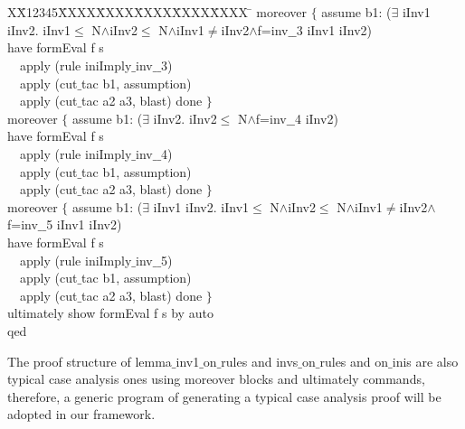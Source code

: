 \documentclass{llncs}
\newlength{\fminilength}
\newenvironment{fmini}[1][\linewidth]
  {\setlength{\fminilength}{#1\fboxsep-2\fboxrule}%
   \vspace{2ex}\noindent\begin{lrbox}{\fminibox}\begin{minipage}{\fminilength}%
   \mbox{ }\hfill\vspace{-2.5ex}}%
  {\end{minipage}\end{lrbox}\vspace{1ex}\hspace{0ex}%
   \framebox{\usebox{\fminibox}}}
\newenvironment{specification}
{\noindent\scriptsize
\tt\begin{fmini}\begin{tabbing}X\=X12345\=XXXX\=XXXX\=XXXX\=XXXX\=XXXX
\=\+\kill} {\end{tabbing}\normalfont\end{fmini}}
\def \twoSpaces {\ \ }
\def \iInv {iInv}
\begin{document}
\begin{specification}
    moreover $\{$
      assume b1:
($\exists$ \iInv1 \iInv2. \iInv1$\le$
N$\wedge$\iInv2$\le$
N$\wedge$\iInv1$\neq$\iInv2$\wedge$f=inv$\_$$\_$3  \iInv1 \iInv2)\\

      have
formEval f s\\

\twoSpaces      apply (rule iniImply$\_$inv$\_$$\_$3)\\
\twoSpaces      apply (cut$\_$tac b1, assumption)\\
\twoSpaces      apply (cut$\_$tac a2 a3, blast) done
    $\}$\\


    moreover $\{$
      assume b1:
($\exists$ \iInv2. \iInv2$\le$
N$\wedge$f=inv$\_$$\_$4  \iInv2)\\

      have
formEval f s\\

\twoSpaces      apply (rule iniImply$\_$inv$\_$$\_$4)\\
\twoSpaces      apply (cut$\_$tac b1, assumption)\\
\twoSpaces      apply (cut$\_$tac a2 a3, blast) done
    $\}$\\


    moreover $\{$
      assume b1:
($\exists$ \iInv1 \iInv2. \iInv1$\le$
N$\wedge$\iInv2$\le$
N$\wedge$\iInv1$\neq$\iInv2$\wedge$f=inv$\_$$\_$5  \iInv1 \iInv2)\\

      have
formEval f s\\

\twoSpaces      apply (rule iniImply$\_$inv$\_$$\_$5)\\
\twoSpaces      apply (cut$\_$tac b1, assumption)\\
\twoSpaces      apply (cut$\_$tac a2 a3, blast) done
    $\}$\\


  ultimately show formEval f s
  by auto\\
qed\\


\end{specification}

The proof structure of {\sf lemma$\_$inv1$\_$on$\_$rules} and  {\sf invs$\_$on$\_$rules} and {\sf on$\_$inis} are also typical case analysis ones using {\sf moreover} blocks and {\sf ultimately} commands, therefore, a generic program of generating a typical case analysis proof will be adopted in our framework.
\end{document}
